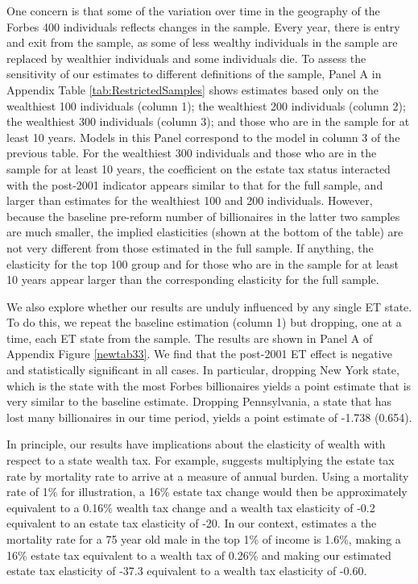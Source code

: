 \documentclass[12pt]{article}
\begin{document}
One concern is that some of the variation over time in the geography of the Forbes 400 individuals reflects changes in the sample.  Every year, there is entry and exit from the sample, as some of less wealthy individuals in the sample are replaced  by  wealthier individuals and some individuals die. 
To assess the sensitivity of our estimates to different definitions of the sample, Panel A in Appendix Table \ref{tab:RestrictedSamples} shows estimates based only on the wealthiest 100 individuals (column 1); 
the wealthiest 200 individuals (column 2); the wealthiest 300 individuals (column 3); and those who are in the sample for at least 10 years. Models in this Panel correspond to the model in column 3 of the previous table. For the wealthiest 300 individuals and those who are in the sample for at least 10 years, the coefficient on the estate tax status interacted with the post-2001 indicator appears similar to that for the full sample, and larger than estimates for the wealthiest 100 and 200 individuals. However, because the baseline pre-reform number of billionaires in the latter two samples are much smaller, the implied elasticities (shown at the bottom of the table) are not very different from those estimated in the full sample. If anything, the elasticity for the top 100 group and for those who are in the sample for at least 10 years appear larger than the corresponding elasticity for the full sample. 

We also explore whether our results are unduly influenced by any single ET state. To do this, we repeat the baseline estimation (column 1) but dropping, one at a time, each ET state from the sample. The results are shown in Panel A of Appendix Figure \ref{newtab33}. We find that the post-2001 ET effect is negative and statistically significant in all cases. In particular, dropping New York state, which is the state with the most Forbes billionaires yields a point estimate that is very similar to the baseline estimate. Dropping Pennsylvania, a state that has lost many billionaires in our time period, yields a point estimate of -1.738 (0.654).

In principle, our results have implications about the elasticity of wealth with respect to a state wealth tax. For example, \cite{poterba2000estate} suggests multiplying the estate tax rate by mortality rate to arrive at a measure of annual burden. Using a mortality rate of 1\% for illustration, a 16\% estate tax change would then be approximately equivalent to a 0.16\% wealth tax change and a wealth tax elasticity of -0.2 equivalent to an estate tax elasticity of -20. In our context, \cite{chetty2016association} estimates a the mortality rate for a 75 year old male in the top 1\% of income is 1.6\%, making a 16\% estate tax equivalent to a wealth tax of 0.26\% and making our estimated estate tax elasticity of -37.3 equivalent to a wealth tax elasticity of -0.60.
\end{document}
